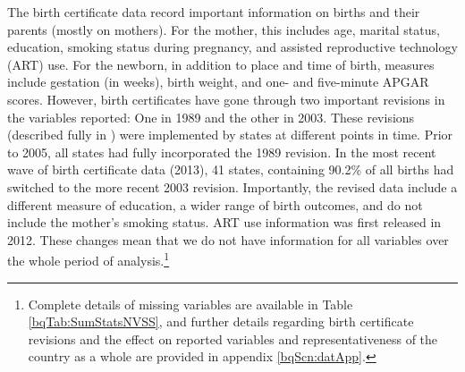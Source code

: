 \documentclass[a4paper, 12 pt]{article}
\theoremstyle{plain}
\begin{document}
\begin{doublespace}
The birth certificate data record important information on births and their parents (mostly on mothers).
For the mother, this includes age, marital status, education, smoking status during pregnancy, and assisted reproductive technology (ART) use. For the newborn, in addition to place and time of birth, measures include gestation (in weeks), birth weight, and one- and five-minute APGAR scores. However, birth certificates have gone through
two important revisions in the variables reported: One in 1989 and the other in
2003.  These revisions (described fully in \citealp{NCHS2000}) were implemented
by states at different points in time.  Prior to 2005, all states had fully
incorporated the 1989 revision.  In the most recent wave of birth certificate
data (2013), 41 states, containing 90.2\% of all births had switched to the
more recent 2003 revision.  Importantly, the revised data include a different
measure of education, a wider range of birth outcomes, and do not include
the mother's smoking status. ART use information was first released in 2012. These changes
mean that we do not have information for all variables over the whole period of analysis.\footnote{Complete
details of missing variables are available in Table
\ref{bqTab:SumStatsNVSS}, and further details regarding birth certificate
revisions and the effect on reported variables and representativeness of the
country as a whole are provided in appendix \ref{bqScn:datApp}.} %



\end{doublespace}
\end{document}
